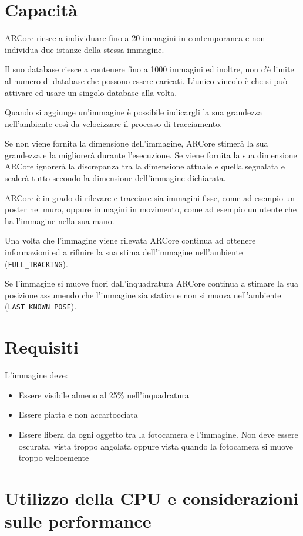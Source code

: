 \documentclass[crop=false, class=book]{standalone}
\begin{document}
	\section{Capacità}
	ARCore riesce a individuare fino a 20 immagini in contemporanea e non individua due istanze della stessa immagine.
	
	Il suo database riesce a contenere fino a 1000 immagini ed inoltre, non c’è limite al numero di database che possono essere caricati. L’unico vincolo è che si può attivare ed usare un singolo database alla volta.
	
	Quando si aggiunge un’immagine è possibile indicargli la sua grandezza nell’ambiente così da velocizzare il processo di tracciamento.
	
	Se non viene fornita la dimensione dell’immagine, ARCore stimerà la sua grandezza e la migliorerà durante l’esecuzione. Se viene fornita la sua dimensione ARCore ignorerà la discrepanza tra la dimensione attuale e quella segnalata e scalerà tutto secondo la dimensione dell’immagine dichiarata.
	
	ARCore è in grado di rilevare e tracciare sia immagini fisse, come ad esempio un poster nel muro, oppure immagini in movimento, come ad esempio un utente che ha l’immagine nella sua mano.
	
	Una volta che l’immagine viene rilevata ARCore continua ad ottenere informazioni ed a rifinire la sua stima dell’immagine nell’ambiente (\verb|FULL_TRACKING|).
	
	Se l’immagine si muove fuori dall’inquadratura ARCore continua a stimare la sua posizione assumendo che l’immagine sia statica e non si muova nell’ambiente (\verb|LAST_KNOWN_POSE|).

	
	\section{Requisiti}
	L’immagine deve:
	\begin{itemize}
		\item Essere visibile almeno al 25\% nell'inquadratura
		\item Essere piatta e non accartocciata
		\item Essere libera da ogni oggetto tra la fotocamera e l'immagine. Non deve essere oscurata, vista troppo angolata oppure vista quando la fotocamera si muove troppo velocemente
	\end{itemize}

	
	\section{Utilizzo della CPU e considerazioni sulle performance}
	
\end{document}
